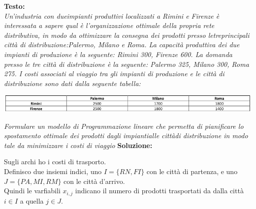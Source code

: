 \documentclass[a4paper,12pt, oneside]{book}
\begin{document}
\begin{esercizio}
  \textbf{Testo:}\\
  \textit{Un’industria con dueimpianti  produttivi  localizzati  a
    Rimini e Firenze è interessata a sapere qual è l’organizzazione
    ottimale della propria rete distributiva, in modo da ottimizzare
    la consegna dei prodotti presso letreprincipali città di
    distribuzione:Palermo, Milano  e Roma.  La  capacità  produttiva
    dei  due  impianti  di  produzione  è  la  seguente: Rimini 300,
    Firenze 600. La domanda presso le tre città di distribuzione è
    la seguente: Palermo 325, Milano 300, Roma 275. I costi associati
    al viaggio tra gli impianti di produzione e le città di
    distribuzione sono dati dalla seguente tabella:}
  \begin{center}
    \includegraphics[scale = 0.7]{img/es3.png}
  \end{center}
  \textit{Formulare un modello di Programmazione lineare che
    permetta di pianificare lo spostamento ottimale dei prodotti
    dagli impiantialle cittàdi distribuzione in modo tale da
    minimizzare i costi di viaggio}\newpage
  \textbf{Soluzione:}\\
  \begin{center}
  \end{center}
  Sugli archi ho i costi di trasporto.\\
  Definisco due insiemi indici, uno $I=\{RN,FI\}$ con le città di
  partenza, e uno $J=\{PA, MI, RM\}$ con le città d'arrivo. \\
  Quindi le varfiabili $x_{i,j}$ indicano il numero di prodotti
  trasportati da dalla città $i\in I$ a quella $j\in J$.\\

\end{esercizio}
\end{document}
